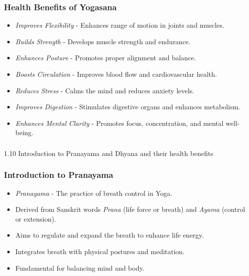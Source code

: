 \begin{frame}[fragile]\frametitle{Health Benefits of Yogasana}

      \begin{itemize}
		\item \textit{Improves Flexibility} - Enhances range of motion in joints and muscles.
		\item \textit{Builds Strength} - Develops muscle strength and endurance.
		\item \textit{Enhances Posture} - Promotes proper alignment and balance.
		\item \textit{Boosts Circulation} - Improves blood flow and cardiovascular health.
		\item \textit{Reduces Stress} - Calms the mind and reduces anxiety levels.
		\item \textit{Improves Digestion} - Stimulates digestive organs and enhances metabolism.
		\item \textit{Enhances Mental Clarity} - Promotes focus, concentration, and mental well-being.
	  \end{itemize}

\end{frame}



\begin{frame}[fragile]\frametitle{}
\begin{center}
{\Large 1.10 Introduction to Pranayama and Dhyana and their health benefits}
\end{center}
\end{frame}

\begin{frame}[fragile]\frametitle{Introduction to Pranayama}

      \begin{itemize}
		\item \textit{Pranayama} - The practice of breath control in Yoga.
		\item Derived from Sanskrit words \textit{Prana} (life force or breath) and \textit{Ayama} (control or extension).
		\item Aims to regulate and expand the breath to enhance life energy.
		\item Integrates breath with physical postures and meditation.
		\item Fundamental for balancing mind and body.
	  \end{itemize}

\end{frame}

